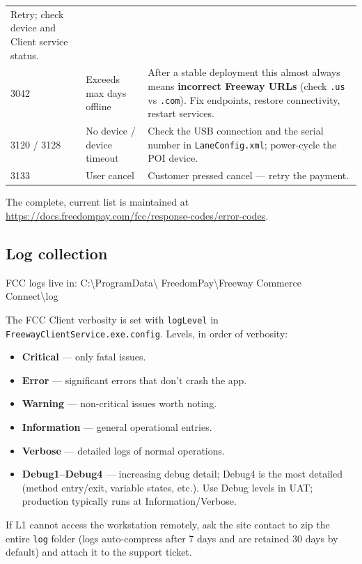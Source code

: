 \documentclass[a4paper,10pt]{article}
\begin{document}
\begin{center}
\begin{tabularx}{\textwidth}{L{12mm} L{44mm} X}
Retry; check device and Client service status.\\
3042 & Exceeds max days offline &
After a stable deployment this almost always means \textbf{incorrect
Freeway URLs} (check \texttt{.us} vs \texttt{.com}). Fix endpoints,
restore connectivity, restart services.\\
3120 / 3128 & No device / device timeout &
Check the USB connection and the serial number in
\texttt{LaneConfig.xml}; power-cycle the POI device.\\
3133 & User cancel & Customer pressed cancel --- retry the payment.\\
\end{tabularx}
\end{center}

The complete, current list is maintained at
\url{https://docs.freedompay.com/fcc/response-codes/error-codes}.

\subsection{Log collection}

FCC logs live in:\newline
{\ttfamily C:\textbackslash ProgramData\textbackslash
FreedomPay\textbackslash Freeway Commerce Connect\textbackslash log}

The FCC Client verbosity is set with \texttt{logLevel} in
\texttt{FreewayClientService.exe.config}. Levels, in order of verbosity:

\begin{itemize}
  \item \textbf{Critical} --- only fatal issues.
  \item \textbf{Error} --- significant errors that don't crash the app.
  \item \textbf{Warning} --- non-critical issues worth noting.
  \item \textbf{Information} --- general operational entries.
  \item \textbf{Verbose} --- detailed logs of normal operations.
  \item \textbf{Debug1--Debug4} --- increasing debug detail; Debug4 is
        the most detailed (method entry/exit, variable states, etc.).
        Use Debug levels in UAT; production typically runs at
        Information/Verbose.
\end{itemize}

If L1 cannot access the workstation remotely, ask the site contact to
zip the entire \texttt{log} folder (logs auto-compress after 7 days and
are retained 30 days by default) and attach it to the support ticket.
\end{document}
